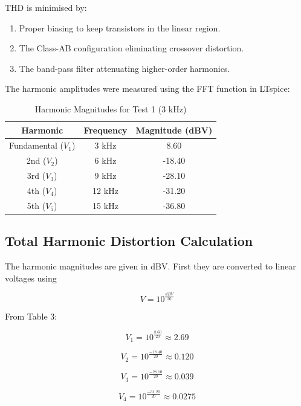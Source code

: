 \documentclass[10pt,twocolumn]{article}
\begin{document}
THD is minimised by:
\begin{enumerate}[nosep]
    \item Proper biasing to keep transistors in the linear region.
    \item The Class-AB configuration eliminating crossover distortion.
    \item The band-pass filter attenuating higher-order harmonics.
\end{enumerate}

The harmonic amplitudes were measured using the FFT function in LTspice:


\begin{table}[h]
\centering
\begin{tabular}{|c|c|c|}
\hline
\textbf{Harmonic} & \textbf{Frequency} & \textbf{Magnitude (dBV)} \\
\hline
Fundamental ($V_1$) & 3 kHz & 8.60 \\
\hline
2nd ($V_2$) & 6 kHz & -18.40 \\
\hline
3rd ($V_3$) & 9 kHz & -28.10 \\
\hline
4th ($V_4$) & 12 kHz & -31.20 \\
\hline
5th ($V_5$) & 15 kHz & -36.80 \\
\hline
\end{tabular}
\caption{Harmonic Magnitudes for Test 1 (3 kHz)}
\end{table}

\subsection{Total Harmonic Distortion Calculation}

The harmonic magnitudes are given in dBV. First they are converted to
linear voltages using

\[
V = 10^{\frac{dBV}{20}}
\]

From Table 3:

\[
V_1 = 10^{\frac{8.60}{20}} \approx 2.69
\]

\[
V_2 = 10^{\frac{-18.40}{20}} \approx 0.120
\]

\[
V_3 = 10^{\frac{-28.10}{20}} \approx 0.039
\]

\[
V_4 = 10^{\frac{-31.20}{20}} \approx 0.0275
\]
\end{document}
